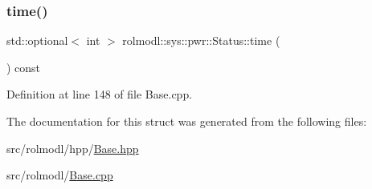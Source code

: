\subsubsection{\texorpdfstring{time()}{time()}}
{\footnotesize\ttfamily std\+::optional$<$ int $>$ rolmodl\+::sys\+::pwr\+::\+Status\+::time (\begin{DoxyParamCaption}{ }\end{DoxyParamCaption}) const\hspace{0.3cm}{\ttfamily [noexcept]}}



Definition at line 148 of file Base.\+cpp.



The documentation for this struct was generated from the following files\+:\begin{DoxyCompactItemize}
\item 
src/rolmodl/hpp/\mbox{\hyperlink{_base_8hpp}{Base.\+hpp}}\item 
src/rolmodl/\mbox{\hyperlink{_base_8cpp}{Base.\+cpp}}\end{DoxyCompactItemize}
